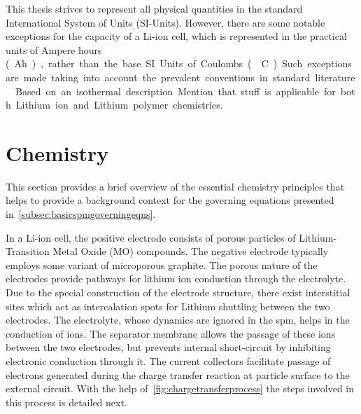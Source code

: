 This  thesis  strives to  represent  all  physical  quantities in  the  standard
International  System  of Units  (SI-Units).  However,  there are  some  notable
exceptions \eg{} for the capacity of a  Li-ion cell, which is represented in the
practical units  of Ampere  hours (\SI{}Ah),  rather than the  base SI  Units of
Coulombs (\SI{}{\coulomb}).  Such exceptions  are made  taking into  account the
prevalent conventions in standard literature.




Based on an isothermal description
Mention  that stuff  is  applicable for  both Lithium  ion  and Lithium  polymer
chemistries.


\section{Chemistry}\label{subsec:liionchemistry}

This section  provides a  brief overview of  the essential  chemistry principles
that helps to provide a background context for the governing equations presented
in~\cref{subsec:basicspmgoverningeqns}.


In  a Li-ion  cell,  the  positive electrode  consists  of  porous particles  of
Lithium-Transition Metal Oxide (MO)  compounds. The negative electrode typically
employs  some  variant  of  microporous  graphite.  The  porous  nature  of  the
electrodes provide pathways for lithium  ion conduction through the electrolyte.
Due  to  the  special  construction  of the  electrode  structure,  there  exist
interstitial  sites  which act  as  intercalation  spots for  Lithium  shuttling
between the two  electrodes. The electrolyte, whose dynamics are  ignored in the
\gls{spm}, helps  in the  conduction of   ions. The  separator membrane
allows  the passage  of  these ions  between the  two  electrodes, but  prevents
internal  short-circuit  by inhibiting  electronic  conduction  through it.  The
current collectors facilitate  passage of electrons generated  during the charge
transfer reaction  at particle surface  to the  external circuit. With  the help
of~\cref{fig:chargetransferprocess}  the  steps  involved  in  this  process  is
detailed next.

